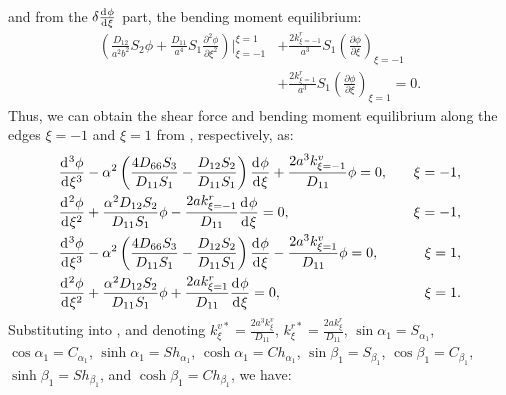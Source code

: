 \documentclass[preprint,12pt]{elsarticle}
\newcommand{\id}{\mathrm{d}\mkern1mu}
\begin{document}
%
and from the \(\delta \frac{\id \phi}{\id \xi}\) part, the bending moment equilibrium:
%
\begin{equation}\label{eq:inertial_forcex2}
	\begin{split}	
		\left( \frac{D_{12}}{a^2b^2} S_2 \phi + \frac{D_{11}}{a^4} S_1 \frac{\partial^2 \phi}{\partial \xi^2} \right) 
		\Big|^{\xi=1}_{\xi=-1} 
		&+ \frac{2k^r_{\xi=-1}}{a^3} S_1 \left(\frac{\partial \phi}{\partial \xi}\right)_{\xi=-1} \\
		&+ \frac{2k^r_{\xi=1}}{a^3} S_1 \left(\frac{\partial \phi}{\partial \xi}\right)_{\xi=1} = 0.
	\end{split}
\end{equation}
%
Thus, we can obtain the shear force and bending moment equilibrium along the edges \(\xi = -1\) and \(\xi = 1\) from , respectively, as:
%
\begin{subequations}\label{eq:boundaryx}
	\begin{align}
		&  \frac{\id^3 \phi}{\id \xi^3} - \alpha^2\left( \frac{4D_{66}S_3}{D_{11}S_1}  - \frac{D_{12}S_2}{D_{11}S_1}  \right) \frac{\id \phi}{\id \xi} 
		+\frac{2a^3k^v_{\xi=-1}}{D_{11}}\phi = 0, \quad &\xi = -1, \\
		& \frac{\id^2 \phi}{\id \xi^2} + \frac{\alpha^2 D_{12} S_2}{D_{11} S_1} \phi - \frac{2a k^r_{\xi=-1}}{D_{11}} \frac{\id \phi}{\id \xi} = 0, \quad &\xi = -1, \\
		& \frac{\id^3 \phi}{\id \xi^3} - \alpha^2\left( \frac{4D_{66}S_3}{D_{11}S_1}  - \frac{D_{12}S_2}{D_{11}S_1}  \right) \frac{\id \phi}{\id \xi} 
		-\frac{2a^3 k^v_{\xi=1}}{D_{11}} \phi = 0, \quad &\xi = 1, \\
		& \frac{\id^2 \phi}{\id \xi^2} + \frac{\alpha^2 D_{12} S_2}{D_{11} S_1} \phi + \frac{2a k^r_{\xi=1}}{D_{11}} \frac{\id \phi}{\id \xi} = 0, \quad &\xi = 1.
	\end{align}
\end{subequations}
%
Substituting  into , and denoting \( k^{v*}_{\xi} = \frac{2a^3 k^v_{\xi}}{D_{11}} \), \( k^{r*}_{\xi} = \frac{2a k^r_{\xi}}{D_{11}} \), \( \sin\alpha_1 = S_{\alpha_1} \), \( \cos\alpha_1 = C_{\alpha_1} \), \( \sinh\alpha_1 = Sh_{\alpha_1} \), \( \cosh\alpha_1 = Ch_{\alpha_1} \), \( \sin\beta_1 = S_{\beta_1} \), \( \cos\beta_1 = C_{\beta_1} \), \( \sinh\beta_1 = Sh_{\beta_1} \), and \( \cosh\beta_1 = Ch_{\beta_1} \), we have:
%
\end{document}

